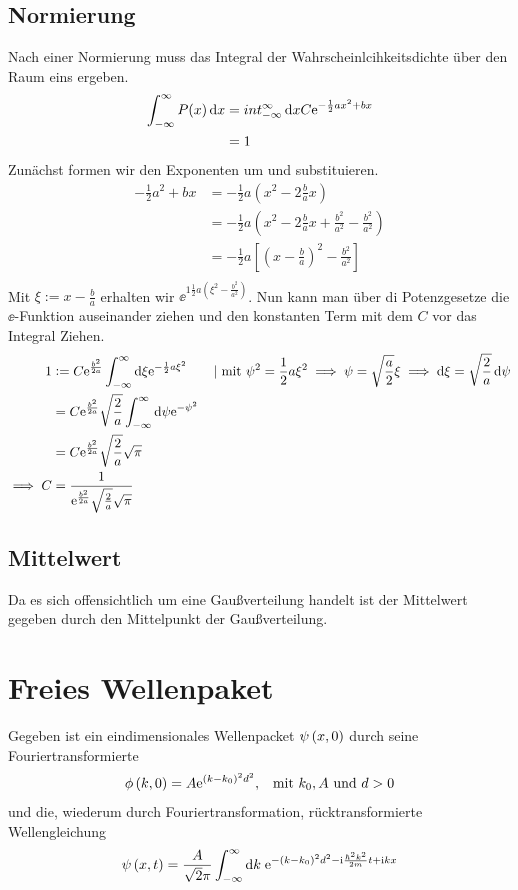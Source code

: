 \subsection{Normierung}
Nach einer Normierung muss das Integral der Wahrscheinlcihkeitsdichte über den Raum eins ergeben.
\begin{align*}
    \int^\infty_{-\infty} P(x)\dif x &= int^\infty_{-\infty}\dif xC\ee^{-\frac 12ax^2+bx} \\
                                     &= 1 \\
\end{align*}
Zunächst formen wir den Exponenten um und substituieren.
\begin{align*}
    -\frac 12a^2+bx &= -\frac 12a(x^2-2\frac bax) \\
                    &= -\frac 12a(x^2-2\frac bax+\frac{b^2}{a^2}-\frac{b^2}{a^2}) \\
                    &= -\frac 12a[(x-\frac ba)^2-\frac{b^2}{a^2}] \\
\end{align*}
Mit $\xi := x-\frac ba$ erhalten wir $\ee^{1\frac 12 a(\xi^2-\frac{b^2}{a^2})}$.
Nun kann man über di Potenzgesetze die $\ee$-Funktion auseinander ziehen und den konstanten Term mit dem $C$ vor das Integral Ziehen.
\begin{align*}
    1&:= C\ee^{\frac{b^2}{2a}}\int^\infty_{-\infty}\dif\xi\ee^{-\frac 12a\xi^2} \qquad|\text{ mit }\psi^2 = \frac 12a\xi^2 \implies \psi=\sqrt{\frac a2}\xi \implies \dif\xi=\sqrt{\frac 2a}\dif \psi\\ 
     &= C\ee^{\frac{b^2}{2a}}\sqrt{\frac 2a}\int^\infty_{-\infty}\dif\psi\ee^{-\psi^2} \\
     &= C\ee^{\frac{b^2}{2a}}\sqrt{\frac 2a}\sqrt{\pi} \\
     \implies C &= \frac{1}{\ee^{\frac{b^2}{2a}}\sqrt{\frac 2a}\sqrt{\pi}} \\
\end{align*}

\subsection{Mittelwert}
Da es sich offensichtlich um eine Gaußverteilung handelt ist der Mittelwert gegeben durch den Mittelpunkt der Gaußverteilung.


\section{Freies Wellenpaket}
Gegeben ist ein eindimensionales Wellenpacket $\psi\del{x,0}$ durch seine Fouriertransformierte
\begin{align*}
	\phi\del{k,0}=A\ee^{\del{k-k_0}^2d^2}, &&\text{mit }k_0,A\text{ und }d>0
\end{align*}
und die, wiederum durch Fouriertransformation, rücktransformierte Wellengleichung
\begin{align*}
	\psi\del{x,t}=\frac{A}{\sqrt{2}\pi}\int_{-\infty}^{\infty}\dif k\;\ee^{-\del{k-k_0}^2d^2-\ii\frac{\hbar^2k^2}{2m}t+\ii kx}
\end{align*}

